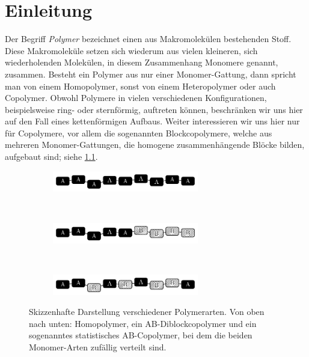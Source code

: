\documentclass[../main.tex]{subfiles}
\begin{document}
\chapter{Einleitung} %
\label{chapter:einleitung}

Der Begriff \emph{Polymer} bezeichnet einen aus Makromolekülen bestehenden Stoff.
Diese Makromoleküle setzen sich wiederum aus vielen kleineren, sich wiederholenden Molekülen, in diesem Zusammenhang Monomere genannt, zusammen.
Besteht ein Polymer aus nur einer Monomer-Gattung, dann spricht man von einem Homopolymer, sonst von einem Heteropolymer oder auch Copolymer.
Obwohl Polymere in vielen verschiedenen Konfigurationen, beispielsweise ring- oder sternförmig, auftreten können, beschränken wir uns hier auf den Fall eines kettenförmigen Aufbaus.
Weiter interessieren wir uns hier nur für Copolymere, vor allem die sogenannten Blockcopolymere, welche aus mehreren Monomer-Gattungen, die homogene zusammenhängende Blöcke bilden, aufgebaut sind; siehe \cref{figure:polymerketten}.

\begin{figure}[tb]
    \centering
    \begin{subfigure}[b]{\textwidth}
        \centering
        \includegraphics[width=0.7\textwidth]{figures/einleitung/copoly1.pdf}
    \end{subfigure}
    \\[-0.75em]
    \begin{subfigure}[b]{\textwidth}
        \centering
        \includegraphics[width=0.7\textwidth]{figures/einleitung/copoly2.pdf}
    \end{subfigure}
    \\[-0.75em]
    \begin{subfigure}[b]{\textwidth}
        \centering
        \includegraphics[width=0.7\textwidth]{figures/einleitung/copoly3.pdf}
    \end{subfigure}
    \caption[Skizzenhafte Darstellung verschiedener Polymerarten]{%
        Skizzenhafte Darstellung verschiedener Polymerarten.
        Von oben nach unten: Homopolymer, ein AB-Diblockcopolymer und ein sogenanntes statistisches AB-Copolymer, bei dem die beiden Monomer-Arten zufällig verteilt sind.
    }
    \label{figure:polymerketten}
\end{figure}
\end{document}
